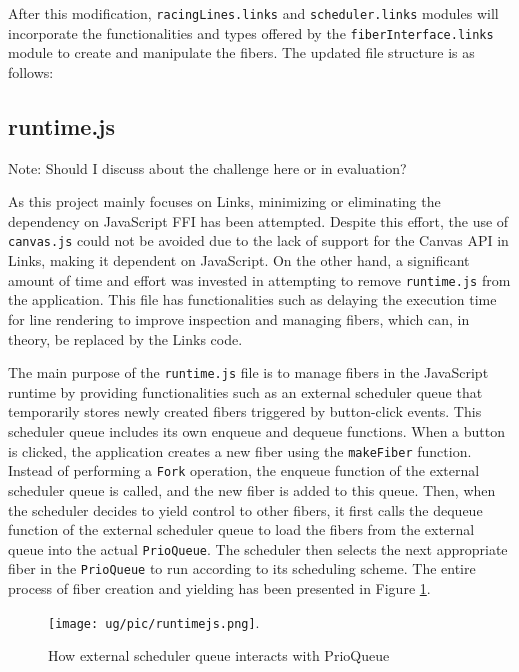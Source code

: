 \documentclass[logo,bsc,singlespacing,parskip]{infthesis}
\begin{document}
After this modification, \texttt{racingLines.links} and \texttt{scheduler.links} modules will incorporate the functionalities and types offered by the \texttt{fiberInterface.links} module to create and manipulate the fibers. The updated file structure is as follows:


\subsection{runtime.js}
\label{runtime}
Note: Should I discuss about the challenge here or in evaluation?

As this project mainly focuses on Links, minimizing or eliminating the dependency on JavaScript FFI has been attempted. Despite this effort, the use of \texttt{canvas.js} could not be avoided due to the lack of support for the Canvas API in Links, making it dependent on JavaScript. On the other hand, a significant amount of  time and effort was invested in attempting to remove \texttt{runtime.js} from the application. This file has functionalities such as delaying the execution time for line rendering to improve inspection and managing fibers, which can, in theory, be replaced by the Links code.

The main purpose of the \texttt{runtime.js} file is to manage fibers in the JavaScript runtime by providing functionalities such as an external scheduler queue that temporarily stores newly created fibers triggered by button-click events. This scheduler queue includes its own enqueue and dequeue functions. When a button is clicked, the application creates a new fiber using the \texttt{makeFiber} function. Instead of performing a \texttt{Fork} operation, the enqueue function of the external scheduler queue is called, and the new fiber is added to this queue. Then, when the scheduler decides to yield control to other fibers, it first calls the dequeue function of the external scheduler queue to load the fibers from the external queue into the actual \texttt{PrioQueue}. The scheduler then selects the next appropriate fiber in the \texttt{PrioQueue} to run according to its scheduling scheme. The entire process of fiber creation and yielding has been presented in Figure \ref{fig:runtimequeue}.

\begin{figure}[htbp]
    \centering
    \texttt{[image: ug/pic/runtimejs.png]}.
    \caption{How external scheduler queue interacts with PrioQueue}
    \label{fig:runtimequeue}
\end{figure}
\end{document}
